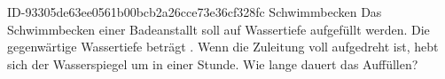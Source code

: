 \begin{exercise}
      {ID-93305de63ee0561b00bcb2a26cce73e36cf328fc}
      {Schwimmbecken}
  \ifproblem\problem
    Das Schwimmbecken einer Badeanstallt soll auf  Wassertiefe aufgefüllt
    werden. Die gegenwärtige Wassertiefe beträgt . Wenn die Zuleitung
    voll aufgedreht ist, hebt sich der Wasserspiegel um  in einer Stunde.
    Wie lange dauert das Auffüllen?
  \fi
\end{exercise}
